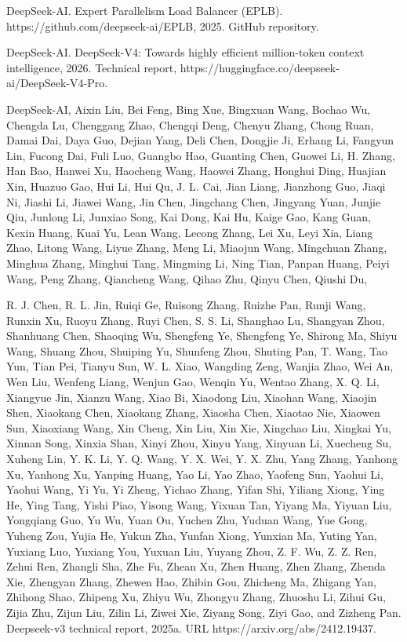 \documentclass[
  10
]{article}
\begin{document}
DeepSeek-AI. Expert Parallelism Load Balancer (EPLB).
https://github.com/deepseek-ai/EPLB, 2025. GitHub repository.

DeepSeek-AI. DeepSeek-V4: Towards highly efficient million-token context
intelligence, 2026. Technical report,
https://huggingface.co/deepseek-ai/DeepSeek-V4-Pro.

DeepSeek-AI, Aixin Liu, Bei Feng, Bing Xue, Bingxuan Wang, Bochao Wu,
Chengda Lu, Chenggang Zhao, Chengqi Deng, Chenyu Zhang, Chong Ruan,
Damai Dai, Daya Guo, Dejian Yang, Deli Chen, Dongjie Ji, Erhang Li,
Fangyun Lin, Fucong Dai, Fuli Luo, Guangbo Hao, Guanting Chen, Guowei
Li, H. Zhang, Han Bao, Hanwei Xu, Haocheng Wang, Haowei Zhang, Honghui
Ding, Huajian Xin, Huazuo Gao, Hui Li, Hui Qu, J. L. Cai, Jian Liang,
Jianzhong Guo, Jiaqi Ni, Jiashi Li, Jiawei Wang, Jin Chen, Jingchang
Chen, Jingyang Yuan, Junjie Qiu, Junlong Li, Junxiao Song, Kai Dong, Kai
Hu, Kaige Gao, Kang Guan, Kexin Huang, Kuai Yu, Lean Wang, Lecong Zhang,
Lei Xu, Leyi Xia, Liang Zhao, Litong Wang, Liyue Zhang, Meng Li, Miaojun
Wang, Mingchuan Zhang, Minghua Zhang, Minghui Tang, Mingming Li, Ning
Tian, Panpan Huang, Peiyi Wang, Peng Zhang, Qiancheng Wang, Qihao Zhu,
Qinyu Chen, Qiushi Du,



R. J. Chen, R. L. Jin, Ruiqi Ge, Ruisong Zhang, Ruizhe Pan, Runji Wang,
Runxin Xu, Ruoyu Zhang, Ruyi Chen, S. S. Li, Shanghao Lu, Shangyan Zhou,
Shanhuang Chen, Shaoqing Wu, Shengfeng Ye, Shengfeng Ye, Shirong Ma,
Shiyu Wang, Shuang Zhou, Shuiping Yu, Shunfeng Zhou, Shuting Pan, T.
Wang, Tao Yun, Tian Pei, Tianyu Sun, W. L. Xiao, Wangding Zeng, Wanjia
Zhao, Wei An, Wen Liu, Wenfeng Liang, Wenjun Gao, Wenqin Yu, Wentao
Zhang, X. Q. Li, Xiangyue Jin, Xianzu Wang, Xiao Bi, Xiaodong Liu,
Xiaohan Wang, Xiaojin Shen, Xiaokang Chen, Xiaokang Zhang, Xiaosha Chen,
Xiaotao Nie, Xiaowen Sun, Xiaoxiang Wang, Xin Cheng, Xin Liu, Xin Xie,
Xingchao Liu, Xingkai Yu, Xinnan Song, Xinxia Shan, Xinyi Zhou, Xinyu
Yang, Xinyuan Li, Xuecheng Su, Xuheng Lin, Y. K. Li, Y. Q. Wang, Y. X.
Wei, Y. X. Zhu, Yang Zhang, Yanhong Xu, Yanhong Xu, Yanping Huang, Yao
Li, Yao Zhao, Yaofeng Sun, Yaohui Li, Yaohui Wang, Yi Yu, Yi Zheng,
Yichao Zhang, Yifan Shi, Yiliang Xiong, Ying He, Ying Tang, Yishi Piao,
Yisong Wang, Yixuan Tan, Yiyang Ma, Yiyuan Liu, Yongqiang Guo, Yu Wu,
Yuan Ou, Yuchen Zhu, Yuduan Wang, Yue Gong, Yuheng Zou, Yujia He, Yukun
Zha, Yunfan Xiong, Yunxian Ma, Yuting Yan, Yuxiang Luo, Yuxiang You,
Yuxuan Liu, Yuyang Zhou, Z. F. Wu, Z. Z. Ren, Zehui Ren, Zhangli Sha,
Zhe Fu, Zhean Xu, Zhen Huang, Zhen Zhang, Zhenda Xie, Zhengyan Zhang,
Zhewen Hao, Zhibin Gou, Zhicheng Ma, Zhigang Yan, Zhihong Shao, Zhipeng
Xu, Zhiyu Wu, Zhongyu Zhang, Zhuoshu Li, Zihui Gu, Zijia Zhu, Zijun Liu,
Zilin Li, Ziwei Xie, Ziyang Song, Ziyi Gao, and Zizheng Pan. Deepseek-v3
technical report, 2025a. URL https://arxiv.org/abs/2412.19437.
\end{document}
